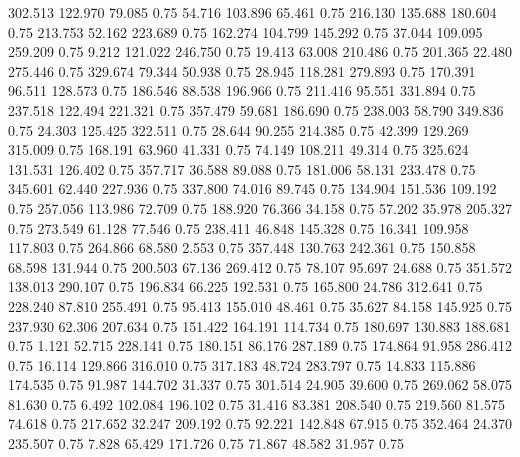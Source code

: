  302.513  122.970   79.085         0.75
  54.716  103.896   65.461         0.75
 216.130  135.688  180.604         0.75
 213.753   52.162  223.689         0.75
 162.274  104.799  145.292         0.75
  37.044  109.095  259.209         0.75
   9.212  121.022  246.750         0.75
  19.413   63.008  210.486         0.75
 201.365   22.480  275.446         0.75
 329.674   79.344   50.938         0.75
  28.945  118.281  279.893         0.75
 170.391   96.511  128.573         0.75
 186.546   88.538  196.966         0.75
 211.416   95.551  331.894         0.75
 237.518  122.494  221.321         0.75
 357.479   59.681  186.690         0.75
 238.003   58.790  349.836         0.75
  24.303  125.425  322.511         0.75
  28.644   90.255  214.385         0.75
  42.399  129.269  315.009         0.75
 168.191   63.960   41.331         0.75
  74.149  108.211   49.314         0.75
 325.624  131.531  126.402         0.75
 357.717   36.588   89.088         0.75
 181.006   58.131  233.478         0.75
 345.601   62.440  227.936         0.75
 337.800   74.016   89.745         0.75
 134.904  151.536  109.192         0.75
 257.056  113.986   72.709         0.75
 188.920   76.366   34.158         0.75
  57.202   35.978  205.327         0.75
 273.549   61.128   77.546         0.75
 238.411   46.848  145.328         0.75
  16.341  109.958  117.803         0.75
 264.866   68.580    2.553         0.75
 357.448  130.763  242.361         0.75
 150.858   68.598  131.944         0.75
 200.503   67.136  269.412         0.75
  78.107   95.697   24.688         0.75
 351.572  138.013  290.107         0.75
 196.834   66.225  192.531         0.75
 165.800   24.786  312.641         0.75
 228.240   87.810  255.491         0.75
  95.413  155.010   48.461         0.75
  35.627   84.158  145.925         0.75
 237.930   62.306  207.634         0.75
 151.422  164.191  114.734         0.75
 180.697  130.883  188.681         0.75
   1.121   52.715  228.141         0.75
 180.151   86.176  287.189         0.75
 174.864   91.958  286.412         0.75
  16.114  129.866  316.010         0.75
 317.183   48.724  283.797         0.75
  14.833  115.886  174.535         0.75
  91.987  144.702   31.337         0.75
 301.514   24.905   39.600         0.75
 269.062   58.075   81.630         0.75
   6.492  102.084  196.102         0.75
  31.416   83.381  208.540         0.75
 219.560   81.575   74.618         0.75
 217.652   32.247  209.192         0.75
  92.221  142.848   67.915         0.75
 352.464   24.370  235.507         0.75
   7.828   65.429  171.726         0.75
  71.867   48.582   31.957         0.75

